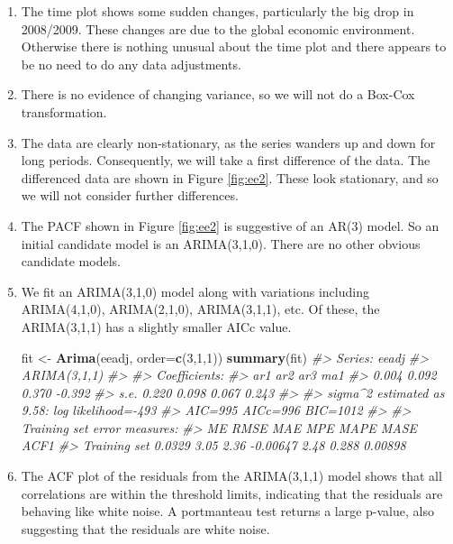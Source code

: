 \documentclass[]{book}
\newenvironment{Shaded}{\begin{snugshade}}{\end{snugshade}}
\newcommand{\CommentTok}[1]{\textcolor[rgb]{0.56,0.35,0.01}{\textit{#1}}}
\newcommand{\DataTypeTok}[1]{\textcolor[rgb]{0.13,0.29,0.53}{#1}}
\newcommand{\DecValTok}[1]{\textcolor[rgb]{0.00,0.00,0.81}{#1}}
\newcommand{\KeywordTok}[1]{\textcolor[rgb]{0.13,0.29,0.53}{\textbf{#1}}}
\newcommand{\NormalTok}[1]{#1}
\newcommand{\StringTok}[1]{\textcolor[rgb]{0.31,0.60,0.02}{#1}}
\begin{document}
\begin{enumerate}
\def\labelenumi{\arabic{enumi}.}
\item
  The time plot shows some sudden changes, particularly the big drop in 2008/2009. These changes are due to the global economic environment. Otherwise there is nothing unusual about the time plot and there appears to be no need to do any data adjustments.
\item
  There is no evidence of changing variance, so we will not do a Box-Cox transformation.
\item
  The data are clearly non-stationary, as the series wanders up and down for long periods. Consequently, we will take a first difference of the data. The differenced data are shown in Figure \ref{fig:ee2}. These look stationary, and so we will not consider further differences.
\item
  The PACF shown in Figure \ref{fig:ee2} is suggestive of an AR(3) model. So an initial candidate model is an ARIMA(3,1,0). There are no other obvious candidate models.
\item
  We fit an ARIMA(3,1,0) model along with variations including ARIMA(4,1,0), ARIMA(2,1,0), ARIMA(3,1,1), etc. Of these, the ARIMA(3,1,1) has a slightly smaller AICc value.

\begin{Shaded}
\begin{Highlighting}[]
\NormalTok{fit <-}\StringTok{ }\KeywordTok{Arima}\NormalTok{(eeadj, }\DataTypeTok{order=}\KeywordTok{c}\NormalTok{(}\DecValTok{3}\NormalTok{,}\DecValTok{1}\NormalTok{,}\DecValTok{1}\NormalTok{))}
\KeywordTok{summary}\NormalTok{(fit)}
\CommentTok{#> Series: eeadj }
\CommentTok{#> ARIMA(3,1,1) }
\CommentTok{#> }
\CommentTok{#> Coefficients:}
\CommentTok{#>         ar1    ar2    ar3     ma1}
\CommentTok{#>       0.004  0.092  0.370  -0.392}
\CommentTok{#> s.e.  0.220  0.098  0.067   0.243}
\CommentTok{#> }
\CommentTok{#> sigma^2 estimated as 9.58:  log likelihood=-493}
\CommentTok{#> AIC=995   AICc=996   BIC=1012}
\CommentTok{#> }
\CommentTok{#> Training set error measures:}
\CommentTok{#>                  ME RMSE  MAE      MPE MAPE  MASE    ACF1}
\CommentTok{#> Training set 0.0329 3.05 2.36 -0.00647 2.48 0.288 0.00898}
\end{Highlighting}
\end{Shaded}
\item
  The ACF plot of the residuals from the ARIMA(3,1,1) model shows that all correlations are within the threshold limits, indicating that the residuals are behaving like white noise. A portmanteau test returns a large p-value, also suggesting that the residuals are white noise.


\end{enumerate}
\end{document}
